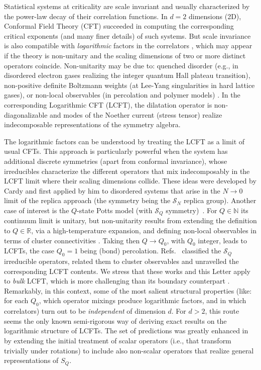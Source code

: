 \documentclass[aps,prl,twocolumn,showpacs,superscriptaddress,groupedaddress]{revtex4}  %
\begin{document}
Statistical systems at criticality are scale invariant and usually characterized by the power-law decay of
 their correlation functions. In $d=2$ dimensions (2D),
Conformal Field Theory (CFT) succeeded in computing the corresponding critical exponents 
(and many finer details) of such systems. But scale invariance
is also compatible with {\em logarithmic} factors in the correlators \cite{Gurarie93}, 
which may appear if the theory is non-unitary and the scaling dimensions of two or more distinct
operators coincide. Non-unitarity may be due to: quenched disorder (e.g., in disordered electron gases realizing the integer quantum Hall
plateau transition), non-positive definite Boltzmann weights (at Lee-Yang singularities in hard lattice gases), or non-local observables (in percolation
and polymer models) \cite{GurarieLudwig,LCFTreview}. In the corresponding Logarithmic CFT (LCFT), the dilatation operator is non-diagonalizable and modes of the Noether current
(stress tensor) realize indecomposable representations of the symmetry algebra.


The logarithmic factors can be understood by treating the LCFT as a limit of usual CFTs. This approach is particularly powerful when the system has
additional discrete symmetries (apart from conformal invariance), whose irreducibles characterize the different operators that mix indecomposably in
the LCFT limit where their scaling dimensions collide. These ideas were developed by Cardy \cite{Cardy99} and first applied by him to disordered systems
that arise in the $N\to0$ limit of the replica approach (the symmetry being the $\mathcal{S}_N$ replica group). 
Another case of interest is the $Q$-state Potts model
(with $\mathcal{S}_Q$ symmetry)~\cite{Wu1982,Cardy99,Vasseur15}. For $Q\in\mathbb{N}$ its continuum limit is unitary, 
but non-unitarity results from extending the
definition to $Q\in\mathbb{R}$, via a high-temperature expansion, and defining non-local observables in terms of 
cluster connectivities \cite{FK}. 
Taking then $Q \to Q_0$, with $Q_0$ integer, leads to LCFTs, the case $Q_0 = 1$ being (bond) percolation. 
Refs.~\cite{VJS,VJ} classified the $\mathcal{S}_Q$ irreducible operators,
related them to cluster observables and unravelled the corresponding LCFT contents.
We stress that these works and this Letter apply to {\em bulk} LCFT, which is more challenging \cite{gl21,puzzle,JS18} than its boundary counterpart \cite{VJS11,Gori2017}.
Remarkably, in this context, some of the most salient structural properties (like: for each $Q_0$,
which operator mixings produce logarithmic factors, and in which correlators) turn out to be {\em independent} of dimension $d$.
For $d>2$, this route seems the only known semi-rigorous way of deriving exact results on the logarithmic structure of LCFTs.
The set of predictions was greatly enhanced in \cite{CJV} by extending the initial treatment \cite{VJS,VJ} 
of scalar operators (i.e., that transform trivially under
rotations) to include also non-scalar operators that realize general representations of $S_Q$.
\end{document}
